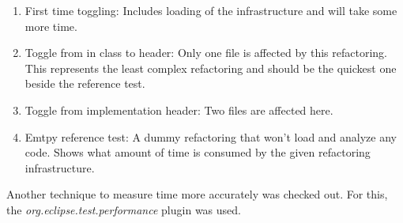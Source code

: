 \begin{enumerate}
\item First time toggling: Includes loading of the infrastructure and will take 
some more time.
\item Toggle from in class to header: Only one file is affected by this 
refactoring. This represents the least complex refactoring and should be the 
quickest one beside the reference test.
\item Toggle from implementation header: Two files are affected here.
\item Emtpy reference test: A dummy refactoring that won't load and analyze any 
code. Shows what amount of time is consumed by the given refactoring 
infrastructure.
\end{enumerate}

Another technique to measure time more accurately was checked out. For this, the 
\textit{org.eclipse.test.performance} plugin was used. 


